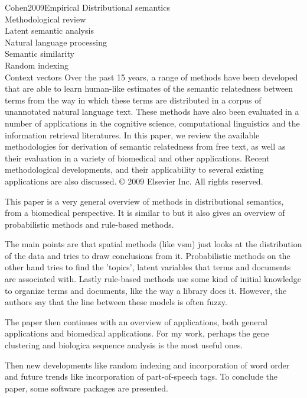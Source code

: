 \begin{review}{Cohen2009Empirical}
				{
					Distributional semantics\\
					Methodological review\\
					Latent semantic analysis\\
					Natural language processing\\
					Semantic similarity\\
					Random indexing\\
					Context vectors
				}
				{
					Over the past 15 years, a range of methods have been developed that are able to learn human-like estimates of the semantic relatedness between terms from the way in which these terms are distributed in a corpus of unannotated natural language text.
					These methods have also been evaluated in a number of applications in the cognitive science, computational linguistics and the information retrieval literatures.
					In this paper, we review the available methodologies for derivation of semantic relatedness from free text, as well as their evaluation in a variety of biomedical and other applications. 
					Recent methodological developments, and their applicability to several existing applications are also discussed. © 2009 Elsevier Inc. All rights reserved.
				}
				
	This paper is a very general overview of methods in distributional semantics, from a biomedical perspective.
	It is similar to \cite{Turney2010VsmOverview} but it also gives an overview of probabilistic methods and rule-based methods.
	
	The main points are that spatial methods (like vsm) just looks at the distribution of the data and tries to draw conclusions from it.
	Probabilistic methods on the other hand tries to find the 'topics', latent variables that terms and documents are associated with.
	Lastly rule-based methods use some kind of initial knowledge to organize terms and documents, like the way a library does it.
	However, the authors say that the line between these models is often fuzzy.

	The paper then continues with an overview of applications, both general applications and biomedical applications.
	For my work, perhaps the gene clustering and biologica sequence analysis is the most useful ones.
	
	Then new developments like random indexing and incorporation of word order and future trends like incorporation of part-of-speech tags.
	To conclude the paper, some software packages are presented.
	

\end{review}

